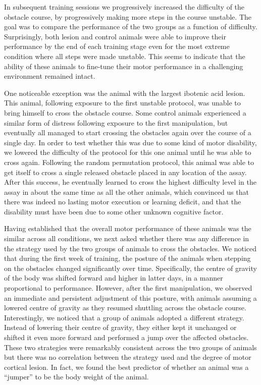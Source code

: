 In subsequent training sessions we progressively increased the difficulty of the obstacle course, by progressively making more steps in the course unstable. The goal was to compare the performance of the two groups as a function of difficulty. Surprisingly, both lesion and control animals were able to improve their performance by the end of each training stage even for the most extreme condition where all steps were made unstable. This seems to indicate that the ability of these animals to fine-tune their motor performance in a challenging environment remained intact.

One noticeable exception was the animal with the largest ibotenic acid lesion. This animal, following exposure to the first unstable protocol, was unable to bring himself to cross the obstacle course. Some control animals experienced a similar form of distress following exposure to the first manipulation, but eventually all managed to start crossing the obstacles again over the course of a single day. In order to test whether this was due to some kind of motor disability, we lowered the difficulty of the protocol for this one animal until he was able to cross again. Following the random permutation protocol, this animal was able to get itself to cross a single released obstacle placed in any location of the assay. After this success, he eventually learned to cross the highest difficulty level in the assay in about the same time as all the other animals, which convinced us that there was indeed no lasting motor execution or learning deficit, and that the disability must have been due to some other unknown cognitive factor. 

Having established that the overall motor performance of these animals was the similar across all conditions, we next asked whether there was any difference in the strategy used by the two groups of animals to cross the obstacles. We noticed that during the first week of training, the posture of the animals when stepping on the obstacles changed significantly over time. Specifically, the centre of gravity of the body was shifted forward and higher in latter days, in a manner proportional to performance. However, after the first manipulation, we observed an immediate and persistent adjustment of this posture, with animals assuming a lowered centre of gravity as they resumed shuttling across the obstacle course. Interestingly, we noticed that a group of animals adopted a different strategy. Instead of lowering their centre of gravity, they either kept it unchanged or shifted it even more forward and performed a jump over the affected obstacles. These two strategies were remarkably consistent across the two groups of animals but there was no correlation between the strategy used and the degree of motor cortical lesion. In fact, we found the best predictor of whether an animal was a ``jumper'' to be the body weight of the animal.

